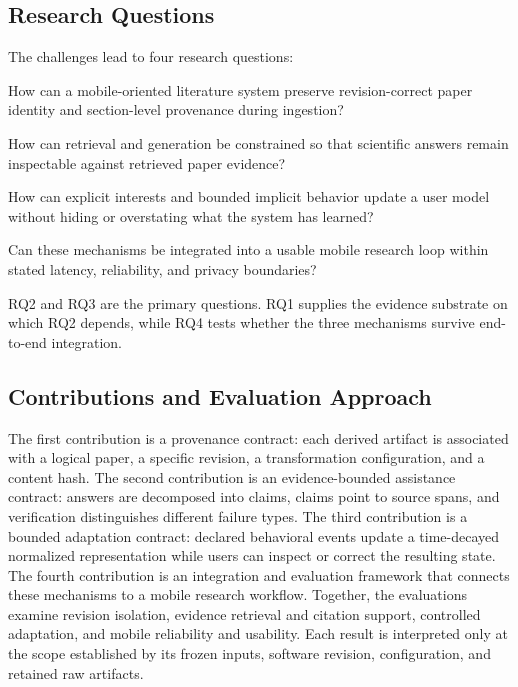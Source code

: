 \subsection{Research Questions}

The challenges lead to four research questions:

\begin{description}[leftmargin=2.3cm,style=nextline]
  \item[RQ1] How can a mobile-oriented literature system preserve revision-correct paper identity and section-level provenance during ingestion?
  \item[RQ2] How can retrieval and generation be constrained so that scientific answers remain inspectable against retrieved paper evidence?
  \item[RQ3] How can explicit interests and bounded implicit behavior update a user model without hiding or overstating what the system has learned?
  \item[RQ4] Can these mechanisms be integrated into a usable mobile research loop within stated latency, reliability, and privacy boundaries?
\end{description}

RQ2 and RQ3 are the primary questions.
RQ1 supplies the evidence substrate on which RQ2 depends, while RQ4 tests whether the three mechanisms survive end-to-end integration.

\subsection{Contributions and Evaluation Approach}

The first contribution is a provenance contract: each derived artifact is associated with a logical paper, a specific revision, a transformation configuration, and a content hash.
The second contribution is an evidence-bounded assistance contract: answers are decomposed into claims, claims point to source spans, and verification distinguishes different failure types.
The third contribution is a bounded adaptation contract: declared behavioral events update a time-decayed normalized representation while users can inspect or correct the resulting state.
The fourth contribution is an integration and evaluation framework that connects these mechanisms to a mobile research workflow.
Together, the evaluations examine revision isolation, evidence retrieval and citation support, controlled adaptation, and mobile reliability and usability.
Each result is interpreted only at the scope established by its frozen inputs, software revision, configuration, and retained raw artifacts.

